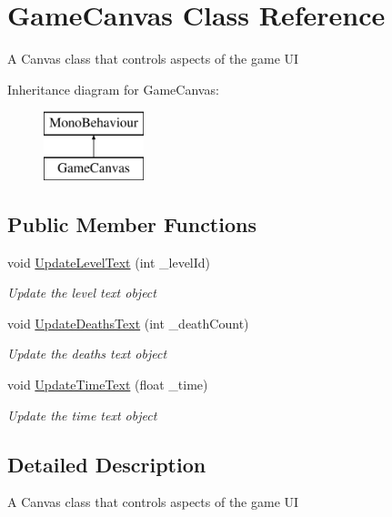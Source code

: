 \hypertarget{class_game_canvas}{}\section{Game\+Canvas Class Reference}
\label{class_game_canvas}


A Canvas class that controls aspects of the game UI  


Inheritance diagram for Game\+Canvas\+:\begin{figure}[H]
\begin{center}
\leavevmode
\includegraphics[height=2.000000cm]{class_game_canvas}
\end{center}
\end{figure}
\subsection*{Public Member Functions}
\begin{DoxyCompactItemize}
\item 
void \mbox{\hyperlink{class_game_canvas_a0fb4b8c30320c818ec44b62689242121}{Update\+Level\+Text}} (int \+\_\+level\+Id)
\begin{DoxyCompactList}\small\item\em Update the level text object \end{DoxyCompactList}\item 
void \mbox{\hyperlink{class_game_canvas_a1216454a399f7fd8b77126860da80802}{Update\+Deaths\+Text}} (int \+\_\+death\+Count)
\begin{DoxyCompactList}\small\item\em Update the deaths text object \end{DoxyCompactList}\item 
void \mbox{\hyperlink{class_game_canvas_a92dd51c7702d5d4e9e14902f3b31ba30}{Update\+Time\+Text}} (float \+\_\+time)
\begin{DoxyCompactList}\small\item\em Update the time text object \end{DoxyCompactList}\end{DoxyCompactItemize}


\subsection{Detailed Description}
A Canvas class that controls aspects of the game UI 



